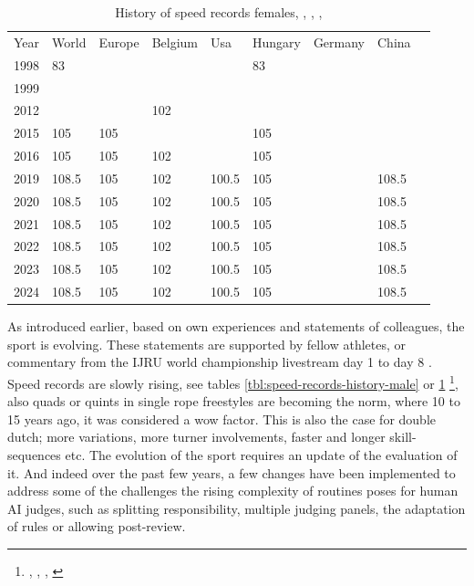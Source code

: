 \begin{table}[]
    \begin{tabular}{lllllllll}
        Year & World & Europe & Belgium & Usa   & Hungary & Germany & China \\
        1998 & 83    &        &         &       & 83      &         &       \\
        1999 &       &        &         &       &         &         &       \\
        2012 &       &        & 102     &       &         &         &       \\
        2015 & 105   & 105    &         &       & 105     &         &       \\
        2016 & 105   & 105    & 102     &       & 105     &         &       \\
        2019 & 108.5 & 105    & 102     & 100.5 & 105     &         & 108.5 \\
        2020 & 108.5 & 105    & 102     & 100.5 & 105     &         & 108.5 \\
        2021 & 108.5 & 105    & 102     & 100.5 & 105     &         & 108.5 \\
        2022 & 108.5 & 105    & 102     & 100.5 & 105     &         & 108.5 \\
        2023 & 108.5 & 105    & 102     & 100.5 & 105     &         & 108.5 \\
        2024 & 108.5 & 105    & 102     & 100.5 & 105     &         & 108.5
    \end{tabular}
    \caption{History of speed records females, \autocite{www_speed_30s_1999_WORLD}, \autocite{www_speed_30s_2024_BE}, \autocite{www_speed_30s_2024_IJRU_WORLD}, \autocite{www_speed_30s_2024_USA_AMJRF}}
    \label{tbl:speed-records-history-female}
\end{table}

As introduced earlier, based on own experiences and statements of colleagues, the sport is evolving. These statements are supported by fellow athletes, or commentary from the IJRU world championship livestream day 1 \autocite{IJRU_yt_2023_livestream_day1} to day 8 \autocite{IJRU_yt_2023_livestream_day8}.
Speed records are slowly rising, see tables \ref{tbl:speed-records-history-male} or \ref{tbl:speed-records-history-female} \footnote{\autocite{www_speed_30s_1999_WORLD}, \autocite{www_speed_30s_2024_BE}, \autocite{www_speed_30s_2024_IJRU_WORLD}, \autocite{www_speed_30s_2024_USA_AMJRF}}, also quads or quints in single rope freestyles are becoming the norm, where 10 to 15 years ago, it was considered a wow factor. This is also the case for double dutch; more variations, more turner involvements, faster and longer skill-sequences etc.
The evolution of the sport requires an update of the evaluation of it. And indeed over the past few years, a few changes have been implemented to address some of the challenges the rising complexity of routines poses for human AI judges, such as splitting responsibility, multiple judging panels, the adaptation of rules or allowing post-review.

